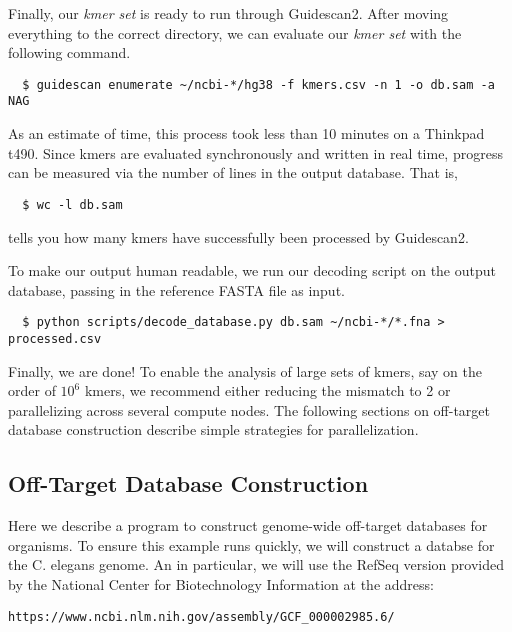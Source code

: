 \documentclass[11pt]{article}
\begin{document}
Finally, our {\it kmer set} is ready to run through Guidescan2. After
moving everything to the correct directory, we can evaluate our {\it
  kmer set} with the following command.  \vspace{-0.8em}
\begin{verbatim}
  $ guidescan enumerate ~/ncbi-*/hg38 -f kmers.csv -n 1 -o db.sam -a NAG
\end{verbatim}
As an estimate of time, this process took less than 10 minutes on a
Thinkpad t490. Since kmers are evaluated synchronously and written in
real time, progress can be measured via the number of lines in the
output database. That is,
\vspace{-0.8em}
\begin{verbatim}
  $ wc -l db.sam
\end{verbatim}
tells you how many kmers have successfully been processed by Guidescan2.

To make our output human readable, we run our decoding script on the
output database, passing in the reference FASTA file as input.
\vspace{-0.8em}
\begin{verbatim}
  $ python scripts/decode_database.py db.sam ~/ncbi-*/*.fna > processed.csv
\end{verbatim}

Finally, we are done! To enable the analysis of large sets of kmers,
say on the order of $10^6$ kmers, we recommend either reducing the
mismatch to 2 or parallelizing across several compute nodes. The
following sections on off-target database construction describe simple
strategies for parallelization.

\subsection{Off-Target Database Construction}
\label{subsec:offtargetdb}

Here we describe a program to construct genome-wide off-target
databases for organisms. To ensure this example runs quickly, we will
construct a databse for the C. elegans genome. An in particular, we
will use the RefSeq version provided by the National Center for
Biotechnology Information at the address:

\begin{center}
  \texttt{https://www.ncbi.nlm.nih.gov/assembly/GCF\_000002985.6/}
\end{center}
\end{document}
